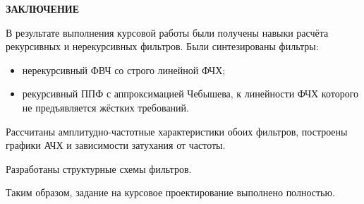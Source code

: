 \newpage
\begin{center}
  \Large{\textbf{ЗАКЛЮЧЕНИЕ}}
\end{center}


В результате выполнения курсовой работы были получены навыки расчёта
рекурсивных и нерекурсивных фильтров. Были синтезированы фильтры:

\begin{itemize}
\item нерекурсивный ФВЧ со строго линейной ФЧХ;
\item рекурсивный ППФ с аппроксимацией Чебышева, к линейности ФЧХ
  которого не предъявляется жёстких требований.
\end{itemize}

Рассчитаны амплитудно-частотные характеристики обоих фильтров, построены графики АЧХ и зависимости затухания от частоты. 

Разработаны структурные схемы фильтров.

Таким образом, задание на курсовое проектирование выполнено полностью.


\newpage


